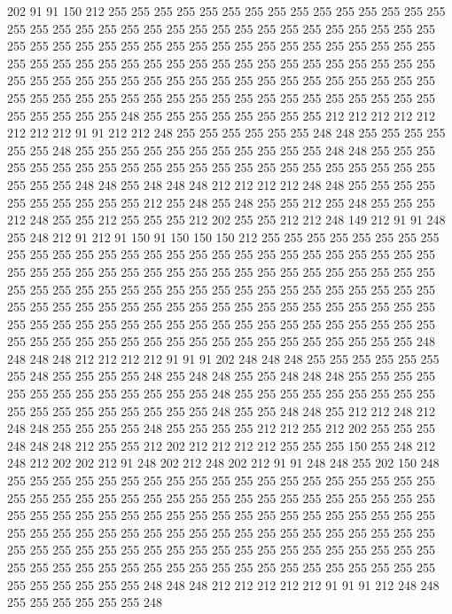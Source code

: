 202 91 91 150 212 255 255 255 255 255 255 255 255 255 255 255 255 255 255 255
255 255 255 255 255 255 255 255 255 255 255 255 255 255 255 255 255 255 255 255
255 255 255 255 255 255 255 255 255 255 255 255 255 255 255 255 255 255 255 255
255 255 255 255 255 255 255 255 255 255 255 255 255 255 255 255 255 255 255 255
255 255 255 255 255 255 255 255 255 255 255 255 255 255 255 255 255 255 255 255
255 255 255 255 255 255 255 255 255 255 255 255 255 255 255 255 255 255 255 255
248 255 255 255 255 255 255 255 255 212 212 212 212 212 212 212 212 91 91 212
212 248 255 255 255 255 255 255 248 248 255 255 255 255 255 255 248 255 255 255
255 255 255 255 255 255 255 255 248 248 255 255 255 255 255 255 255 255 255 255
255 255 255 255 255 255 255 255 255 255 255 255 255 255 255 248 248 255 248 248
248 212 212 212 212 248 248 255 255 255 255 255 255 255 255 255 255 212 255 248
255 248 255 255 212 255 248 255 255 255 212 248 255 255 212 255 255 255 212 202
255 255 212 212 248 149 212 91 91 248 255 248 212 91 212 91 150 91 150 150
150 212 255 255 255 255 255 255 255 255 255 255 255 255 255 255 255 255 255 255
255 255 255 255 255 255 255 255 255 255 255 255 255 255 255 255 255 255 255 255
255 255 255 255 255 255 255 255 255 255 255 255 255 255 255 255 255 255 255 255
255 255 255 255 255 255 255 255 255 255 255 255 255 255 255 255 255 255 255 255
255 255 255 255 255 255 255 255 255 255 255 255 255 255 255 255 255 255 255 255
255 255 255 255 255 255 255 255 255 255 255 255 255 255 255 255 255 255 255 255
255 255 255 248 248 248 248 212 212 212 212 91 91 91 202 248 248 248 255 255
255 255 255 255 255 248 255 255 255 255 248 255 248 248 255 255 248 248 248 255
255 255 255 255 255 255 255 255 255 255 255 255 248 255 255 255 255 255 255 255
255 255 255 255 255 255 255 255 255 255 255 248 255 255 248 248 255 212 212 248
212 248 248 255 255 255 255 248 255 255 255 255 212 212 255 212 202 255 255 255
248 248 248 212 255 255 212 202 212 212 212 212 255 255 255 150 255 248 212 248
212 202 202 212 91 248 202 212 248 202 212 91 91 248 248 255 202 150 248 255
255 255 255 255 255 255 255 255 255 255 255 255 255 255 255 255 255 255 255 255
255 255 255 255 255 255 255 255 255 255 255 255 255 255 255 255 255 255 255 255
255 255 255 255 255 255 255 255 255 255 255 255 255 255 255 255 255 255 255 255
255 255 255 255 255 255 255 255 255 255 255 255 255 255 255 255 255 255 255 255
255 255 255 255 255 255 255 255 255 255 255 255 255 255 255 255 255 255 255 255
255 255 255 255 255 255 255 255 255 255 255 255 255 255 255 255 255 255 255 248
248 248 212 212 212 212 212 91 91 91 212 248 248 255 255 255 255 255 255 248
